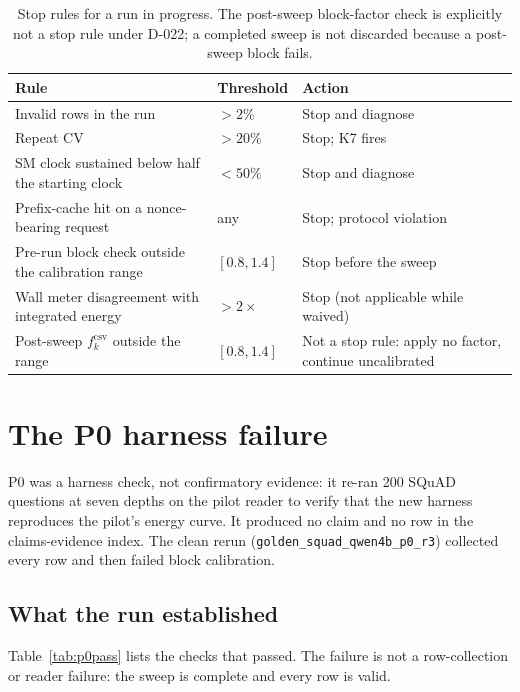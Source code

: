 \begin{table}[pos=htbp]
  \centering
  \caption{Stop rules for a run in progress. The post-sweep block-factor check is explicitly not
  a stop rule under D-022; a completed sweep is not discarded because a post-sweep block fails.}
  \label{tab:stop}
  \small
  \begin{tabularx}{\textwidth}{>{\raggedright\arraybackslash}p{6.0cm}>{\raggedright\arraybackslash}p{3.0cm}>{\raggedright\arraybackslash}X}
    \toprule
    \textbf{Rule} & \textbf{Threshold} & \textbf{Action} \\
    \midrule
    Invalid rows in the run & $>2\%$ & Stop and diagnose \\
    Repeat CV & $>20\%$ & Stop; K7 fires \\
    SM clock sustained below half the starting clock & $<50\%$ & Stop and diagnose \\
    Prefix-cache hit on a nonce-bearing request & any & Stop; protocol violation \\
    Pre-run block check outside the calibration range & $[0.8,1.4]$ & Stop before the sweep \\
    Wall meter disagreement with integrated energy & $>2\times$ & Stop (not applicable while waived) \\
    Post-sweep $f^{\mathrm{csv}}_k$ outside the range & $[0.8,1.4]$ & Not a stop rule: apply no factor, continue uncalibrated \\
    \bottomrule
  \end{tabularx}
\end{table}

\section{The P0 harness failure}\label{sec:s5}

P0 was a harness check, not confirmatory evidence: it re-ran 200 SQuAD questions at seven depths
on the pilot reader to verify that the new harness reproduces the pilot's energy curve. It
produced no claim and no row in the claims-evidence index. The clean rerun
(\texttt{golden\_squad\_qwen4b\_p0\_r3}) collected every row and then failed block calibration.

\subsection{What the run established}

Table~\ref{tab:p0pass} lists the checks that passed. The failure is not a row-collection or
reader failure: the sweep is complete and every row is valid.

